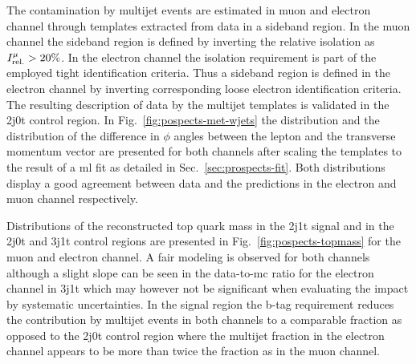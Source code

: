 

The contamination by multijet events are estimated in muon and electron channel through templates extracted from data in a sideband region. In the muon channel the sideband region is defined by inverting the relative isolation as $\muiso>20\%$. In the electron channel the isolation requirement is part of the employed tight identification criteria. Thus a sideband region is defined in the electron channel by inverting corresponding loose electron identification criteria. The resulting description of data by the multijet templates is validated in the 2j0t control region. In Fig.~\ref{fig:pospects-met-wjets} the \met distribution and the distribution of the difference in $\phi$ angles between the lepton and the transverse momentum vector are presented for both channels after scaling the templates to the result of a \gls{ml} fit as detailed in Sec.~\ref{sec:prospects-fit}. Both distributions display a good agreement between data and the predictions in the electron and muon channel respectively.

Distributions of the reconstructed top quark mass in the 2j1t signal and in the 2j0t \wjets and 3j1t \ttbar control regions are presented in Fig.~\ref{fig:pospects-topmass} for the muon and electron channel. A fair modeling is observed for both channels although a slight slope can be seen in the data-to-\gls{mc} ratio for the electron channel in 3j1t which may however not be significant when evaluating the impact by systematic uncertainties. In the signal region the b-tag requirement reduces the contribution by multijet events in both channels to a comparable fraction as opposed to the 2j0t control region where the multijet fraction in the electron channel appears to be more than twice the fraction as in the muon channel.

